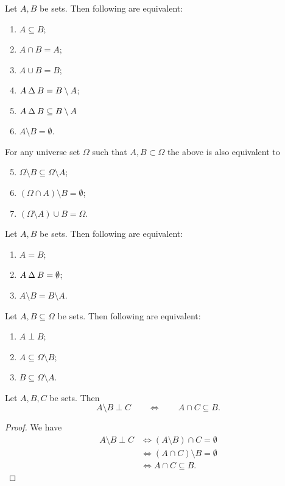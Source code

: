 \begin{lemma} \label{inclusionCriteria}
Let $A,B$ be sets. Then following are equivalent:
\begin{enumerate}
\item $A\subseteq B$;
\item $A\cap B = A$;
\item $A\cup B = B$;
\item $A\mathbin{\Delta} B = B\setminus A$;
\item $A\mathbin{\Delta} B \subseteq B\setminus A$
\item $A\setminus B = \emptyset$.
\end{enumerate}
For any universe set $\Omega$ such that $A,B\subset \Omega$ the above is also equivalent to
\begin{enumerate}\setcounter{enumi}{4}
\item $\Omega\setminus B \subseteq \Omega\setminus A$;
\item $(\Omega\cap A)\setminus B = \emptyset$;
\item $(\Omega\setminus A)\cup B = \Omega$.
\end{enumerate}
\end{lemma}
\begin{corollary}
Let $A,B$ be sets. Then following are equivalent:
\begin{enumerate}
\item $A=B$;
\item $A\mathbin{\Delta} B = \emptyset$;
\item $A\setminus B = B\setminus A$.
\end{enumerate}
\end{corollary}
\begin{corollary} \label{setPerpInequality}
Let $A,B\subseteq \Omega$ be sets. Then following are equivalent:
\begin{enumerate}
\item $A\perp B$;
\item $A \subseteq \Omega\setminus B$;
\item $B \subseteq \Omega\setminus A$.
\end{enumerate}
\end{corollary}

\begin{lemma} \label{disjointSetDifference}
Let $A,B,C$ be sets. Then
\[ A\setminus B \perp C \qquad\iff\qquad A\cap C \subseteq B. \]
\end{lemma}
\begin{proof}
We have
\begin{align*}
A\setminus B \perp C &\iff (A\setminus B) \cap C = \emptyset \\
&\iff (A\cap C)\setminus B = \emptyset \\
&\iff A\cap C \subseteq B.
\end{align*}
\end{proof}

